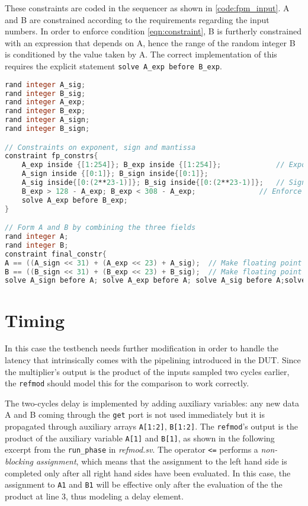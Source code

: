 These constraints are coded in the sequencer as shown in \ref{code:fpm_input}. A and B are constrained according to the requirements regarding the input numbers. In order to enforce condition \ref{eqn:constraint}, B is furtherly constrained with an expression that depends on A, hence the range of the random integer B is conditioned by the value taken by A. The correct implementation of this requires the explicit statement \texttt{solve A\_exp before B\_exp}.

\begin{lstlisting}[language = verilog, label = code:fpm_input, caption=\textit{packet\_in.sv}]
rand integer A_sig;
rand integer B_sig;
rand integer A_exp;
rand integer B_exp;
rand integer A_sign;
rand integer B_sign;

// Constraints on exponent, sign and mantissa
constraint fp_constrs{
	A_exp inside {[1:254]}; B_exp inside {[1:254]}; 		    // Exponent
	A_sign inside {[0:1]}; B_sign inside{[0:1]}; 					 			// Sign
	A_sig inside{[0:(2**23-1)]}; B_sig inside{[0:(2**23-1)]}; 	// Significand
	B_exp > 128 - A_exp; B_exp < 308 - A_exp;  				// Enforce condition on sum of exponents
	solve A_exp before B_exp;
}

// Form A and B by combining the three fields
rand integer A;
rand integer B;
constraint final_constr{
A == ((A_sign << 31) + (A_exp << 23) + A_sig);  // Make floating point number A
B == ((B_sign << 31) + (B_exp << 23) + B_sig);  // Make floating point number B
solve A_sign before A; solve A_exp before A; solve A_sig before A;solve B_sign before B; solve B_exp before B;solve B_sig before B;}
\end{lstlisting}


\section{Timing}
In this case the testbench needs further modification in order to handle the latency that intrinsically comes with the pipelining introduced in the DUT. Since the multiplier's output is the product of the inputs sampled two cycles earlier, the \texttt{refmod} should model this for the comparison to work correctly.

The two-cycles delay is implemented by adding auxiliary variables: any new data A and B coming through the \texttt{get} port is not used immediately but it is propagated through auxiliary arrays \texttt{A[1:2]}, \texttt{B[1:2]}. The \texttt{refmod}'s output is the product of the auxiliary variable \texttt{A[1]} and \texttt{B[1]}, as shown in the following excerpt from the \texttt{run\_phase} in \textit{refmod.sv}. The operator \texttt{<=} performs a \textit{non-blocking assignment}, which means that the assignment to the left hand side is completed only after all right hand sides have been evaluated. In this case, the assignment to \texttt{A1} and \texttt{B1} will be effective only after the evaluation of the the product at line 3, thus modeling a delay element.

